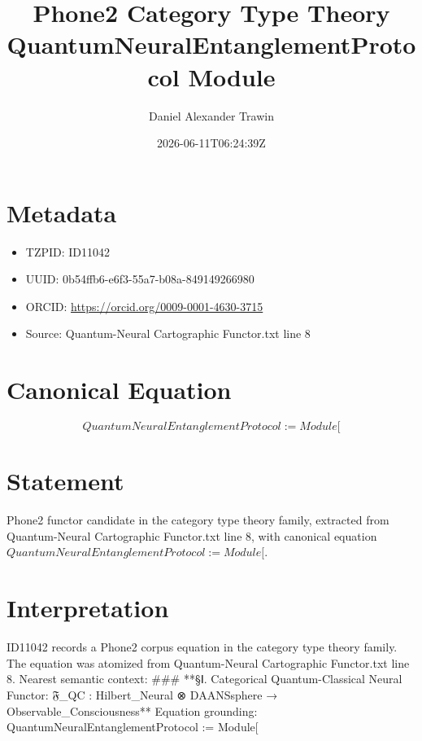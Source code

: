 \documentclass[11pt]{article}
\title{Phone2 Category Type Theory QuantumNeuralEntanglementProtocol Module}
\author{Daniel Alexander Trawin}
\date{2026-06-11T06:24:39Z}
\begin{document}
\maketitle
\section*{Metadata}
\begin{itemize}
\item TZPID: ID11042
\item UUID: 0b54ffb6-e6f3-55a7-b08a-849149266980
\item ORCID: \url{https://orcid.org/0009-0001-4630-3715}
\item Source: Quantum-Neural Cartographic Functor.txt line 8
\end{itemize}
\section*{Canonical Equation}
\[
QuantumNeuralEntanglementProtocol := Module[
\]
\section*{Statement}
Phone2 functor candidate in the category type theory family, extracted from Quantum-Neural Cartographic Functor.txt line 8, with canonical equation $QuantumNeuralEntanglementProtocol := Module[$.
\section*{Interpretation}
ID11042 records a Phone2 corpus equation in the category type theory family. The equation was atomized from Quantum-Neural Cartographic Functor.txt line 8. Nearest semantic context: ### **§Ⅰ. Categorical Quantum-Classical Neural Functor: 𝔉_QC : Hilbert_Neural ⊗ DAANSsphere → Observable_Consciousness** Equation grounding: QuantumNeuralEntanglementProtocol := Module[
\end{document}
